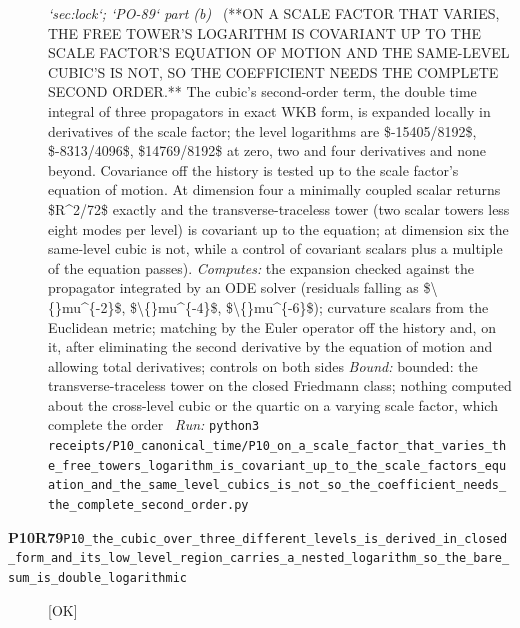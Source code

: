 \begin{description}
\textit{`sec:lock`; `PO-89` part (b)} \ (**ON A SCALE FACTOR THAT VARIES, THE FREE TOWER'S LOGARITHM IS COVARIANT UP TO THE SCALE FACTOR'S EQUATION OF MOTION AND THE SAME-LEVEL CUBIC'S IS NOT, SO THE COEFFICIENT NEEDS THE COMPLETE SECOND ORDER.** The cubic's second-order term, the double time integral of three propagators in exact WKB form, is expanded locally in derivatives of the scale factor; the level logarithms are \$-15405/8192\$, \$-8313/4096\$, \$14769/8192\$ at zero, two and four derivatives and none beyond. Covariance off the history is tested up to the scale factor's equation of motion. At dimension four a minimally coupled scalar returns \$R\textasciicircum{}2/72\$ exactly and the transverse-traceless tower (two scalar towers less eight modes per level) is covariant up to the equation; at dimension six the same-level cubic is not, while a control of covariant scalars plus a multiple of the equation passes). 
\emph{Computes:} the expansion checked against the propagator integrated by an ODE solver (residuals falling as \$\textbackslash\{\}mu\textasciicircum{}\{-2\}\$, \$\textbackslash\{\}mu\textasciicircum{}\{-4\}\$, \$\textbackslash\{\}mu\textasciicircum{}\{-6\}\$); curvature scalars from the Euclidean metric; matching by the Euler operator off the history and, on it, after eliminating the second derivative by the equation of motion and allowing total derivatives; controls on both sides
 \emph{Bound:} bounded: the transverse-traceless tower on the closed Friedmann class; nothing computed about the cross-level cubic or the quartic on a varying scale factor, which complete the order
\ \emph{Run:} \texttt{python3 receipts/P10\_canonical\_time/P10\_on\_a\_scale\_factor\_that\_varies\_the\_free\_towers\_logarithm\_is\_covariant\_up\_to\_the\_scale\_factors\_equation\_and\_the\_same\_level\_cubics\_is\_not\_so\_the\_coefficient\_needs\_the\_complete\_second\_order.py}
\item[\rcptlabel{P10_the_cubic_over_three_different_levels_is_derived_in_closed_form_and_its_low_level_region_carries_a_nested_logarithm_so_the_bare_sum_is_double_logarithmic}{P10R79}\textbf{P10R79}\quad\texttt{P10\_the\_cubic\_over\_three\_different\_levels\_is\_derived\_in\_closed\_form\_and\_its\_low\_level\_region\_carries\_a\_nested\_logarithm\_so\_the\_bare\_sum\_is\_double\_logarithmic}]\hfill\textsf{[OK]}\\

\end{description}
